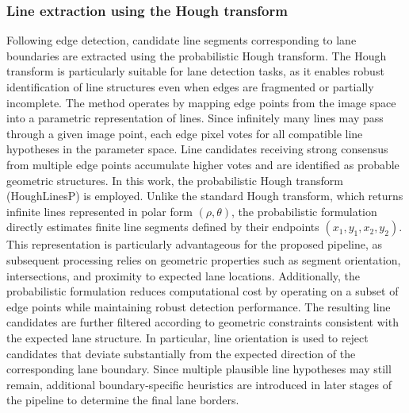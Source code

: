 \subsubsection{Line extraction using the Hough transform}
Following edge detection, candidate line segments corresponding to lane boundaries are extracted using the probabilistic Hough transform. The Hough transform is particularly suitable for lane detection tasks, as it enables robust identification of line structures even when edges are fragmented or partially incomplete. The method operates by mapping edge points from the image space into a parametric representation of lines. Since infinitely many lines may pass through a given image point, each edge pixel votes for all compatible line hypotheses in the parameter space. Line candidates receiving strong consensus from multiple edge points accumulate higher votes and are identified as probable geometric structures.
In this work, the probabilistic Hough transform (HoughLinesP) is employed. Unlike the standard Hough transform, which returns infinite lines represented in polar form $(\rho,\theta)$, the probabilistic formulation directly estimates finite line segments defined by their endpoints $(x_1, y_1, x_2, y_2)$. This representation is particularly advantageous for the proposed pipeline, as subsequent processing relies on geometric properties such as segment orientation, intersections, and proximity to expected lane locations. Additionally, the probabilistic formulation reduces computational cost by operating on a subset of edge points while maintaining robust detection performance.
The resulting line candidates are further filtered according to geometric constraints consistent with the expected lane structure. In particular, line orientation is used to reject candidates that deviate substantially from the expected direction of the corresponding lane boundary. Since multiple plausible line hypotheses may still remain, additional boundary-specific heuristics are introduced in later stages of the pipeline to determine the final lane borders.


